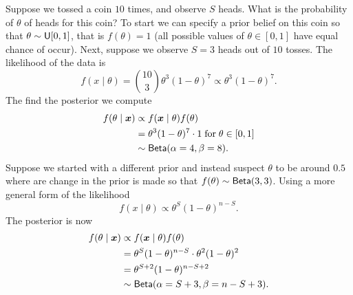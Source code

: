 \begin{exam} \label{exam: coin_eg}
    Suppose we tossed a coin $10$ times, and observe $S$ heads. What is the probability of $\theta$ of heads for this coin? To start we can specify a prior belief on this coin so that $\theta \sim {\sf U} [0,1]$, that is $f(\theta) = 1$ (all possible values of $\theta \in [0,1]$ have equal chance of occur). Next, suppose we observe $S=3$ heads out of $10$ tosses. The likelihood of the data is
    \[
        f(x \mid \theta) = \binom{10}{3} \theta^3 (1-\theta)^{7} \propto \theta^3 (1-\theta)^{7}.
    \]
    The find the posterior we compute
    \begin{align*}
        f(\theta \mid \bm{x})
         & \propto f(\bm{x} \mid \theta) f(\theta)                             \\
         & = \theta^3 (1-\theta)^{7} \cdot 1 \; \text{for} \; \theta \in [0,1] \\
         & \sim {\sf Beta} (\alpha = 4, \beta =8).
    \end{align*}
    Suppose we started with a different prior and instead suspect $\theta$ to be around $0.5$ where are change in the prior is made so that $f(\theta) \sim {\sf Beta} (3,3)$. Using a more general form of the likelihood
    \[
        f(x \mid \theta) \propto \theta^S (1-\theta)^{n-S}.
    \]
    The posterior is now
    \begin{align*}
        f(\theta \mid \bm{x})
         & \propto f(\bm{x} \mid \theta) f(\theta)                   \\
         & = \theta^S (1-\theta)^{n-S} \cdot \theta^2 (1-\theta)^{2} \\
         & = \theta^{S + 2} (1-\theta)^{n-S+2}                       \\
         & \sim {\sf Beta} (\alpha = S+3, \beta =n-S+3).
    \end{align*}
\end{exam}

